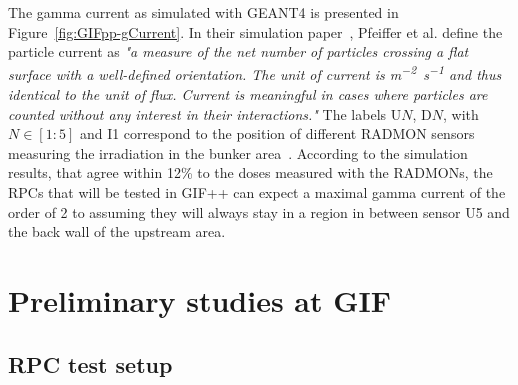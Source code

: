 	The gamma current as simulated with GEANT4 is presented in Figure~\ref{fig:GIFpp-gCurrent}. In their simulation paper~\cite{PFEIFFER2017}, Pfeiffer et al. define the particle current as \textit{"a measure of the net number of particles crossing a flat surface with a well-defined orientation. The unit of current is \si{m^{-2}.s^{-1}} and thus identical to the unit of flux. Current is meaningful in cases where particles are counted without any interest in their interactions."} The labels U$N$, D$N$, with $N \in [1:5]$ and I1 correspond to the position of different \acf{RADMON} sensors measuring the irradiation in the bunker area~\cite{PFEIFFER2017}. According to the simulation results, that agree within 12\% to the doses measured with the RADMONs, the RPCs that will be tested in GIF++ can expect a maximal gamma current of the order of 2 to  \siflux assuming they will always stay in a region in between sensor U5 and the back wall of the upstream area.
	 
\section{Preliminary studies at GIF}
\label{chapt5:sec:GIFtests}

	\subsection{RPC test setup}
	\label{chapt5:ssec:RPCSetup}

